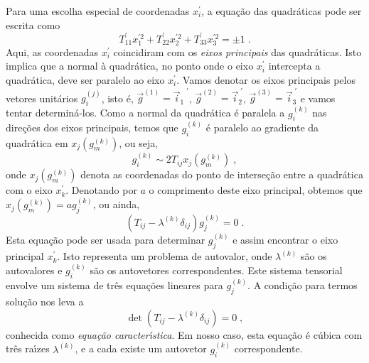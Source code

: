 Para uma escolha especial de coordenadas $x_i^{'}$, a
equa\c{c}\~ao das quadr\'aticas pode ser escrita como
\begin{equation}
   T_{11}^{'} x_1^{'2}+T_{22}^{'} x_2^{'2}+T_{33}^{'} x_3^{'2}= \pm 1 \;.
   \label{T_q_especial}
\end{equation}
Aqui, as coordenadas $x_i^{'}$ coincidiram com os { \it eixos
principais} das quadr\'aticas. Isto implica que a normal \`a
quadr\'atica, no ponto onde o eixo $x_i^{'}$ intercepta a
quadr\'atica, deve ser paralelo ao eixo $x_i^{'}$. Vamos denotar
os eixos principais pelos vetores unit\'arios $g_i^{(j)}$, isto
\'e, $\vec{g}^{(1)}={\vec{i}_1}^{\;'}$,
$\vec{g}^{(2)}=\vec{i}_2^{\;'}$, $\vec{g}^{(3)}=\vec{i}_3^{\;'}$ e
vamos tentar determin\'a-los. Como a normal da quadr\'atica \'e
paralela a $g_i^{(k)}$ nas dire\c{c}\~oes dos eixos principais,
temos que $g_i^{(k)}$ \'e paralelo ao gradiente da quadr\'atica em
$x_j(g_m^{(k)})$, ou seja,
\begin{equation}
   g_i^{(k)} \sim 2T_{ij} x_j (g_m^{(k)}) \;,
   \label{auto_1}
\end{equation}
onde $x_j(g_m^{(k)})$ denota as coordenadas do ponto de
interse\c{c}\~ao entre a quadr\'atica com o eixo $x_k^{'}$.
Denotando por $a$ o comprimento deste eixo principal, obtemos que
$x_j(g_m^{(k)}) = a g_j^{(k)}$, ou ainda,
\begin{equation}
   (T_{ij}-\lambda^{(k)} \delta_{ij}) g_j^{(k)}=0 \;.
   \label{auto_2}
\end{equation}
Esta equa\c{c}\~ao pode ser usada para determinar $g_j^{(k)}$ e
assim encontrar o eixo principal $x_k^{'}$. Isto representa um
problema de autovalor, onde $\lambda^{(k)}$ s\~ao os autovalores e
$g_i^{(k)}$ s\~ao os autovetores correspondentes. Este sistema
tensorial envolve um sistema de tr\^es equa\c{c}\~oes lineares
para $g_j^{(k)}$. A condi\c{c}\~ao para termos solu\c{c}\~ao nos
leva a
\begin{equation}
   \det(T_{ij}-\lambda^{(k)} \delta_{ij})=0 \;,
   \label{auto_3}
\end{equation}
conhecida como {\it equa\c{c}\~ao caracter\'{\i}stica}. Em nosso
caso, esta equa\c{c}\~ao \'e c\'ubica com tr\^es ra\'{\i}zes
$\lambda^{(k)}$, e a cada existe um autovetor $g_i^{(k)}$
correspondente.

